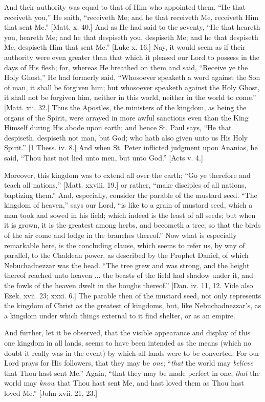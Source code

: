 And their authority was equal to that of Him who appointed them.
``He that receiveth you,'' He saith, ``receiveth Me; and
he that receiveth Me, receiveth Him that sent Me.'' [Matt. x. 40.]
And as He had said to the seventy, ``He that heareth you, heareth
Me; and he that despiseth you, despiseth Me; and he that despiseth Me,
despiseth Him that sent Me.'' [Luke x. 16.] Nay, it would seem as
if their authority were even greater than that which it pleased our
Lord to possess in the days of His flesh; for, whereas He breathed on
them and said, ``Receive ye the Holy Ghost,'' He had formerly
said, ``Whosoever speaketh a word against the Son of man, it shall
be forgiven him; but whosoever speaketh against the Holy Ghost, it
shall not be forgiven him, neither in this world, neither in the world
to come.'' [Matt. xii. 32.] Thus the Apostles, the ministers of
the kingdom, as being the organs of the Spirit, were arrayed in more
awful sanctions even than the King Himself during His abode upon
earth; and hence St. Paul says, ``He that despiseth, despiseth not
man, but God; who hath also given unto us His Holy Spirit.'' [1
Thess. iv. 8.] And when St. Peter inflicted judgment upon Ananias, he
said, ``Thou hast not lied unto men, but unto God.'' [Acts v.
4.]

Moreover, this kingdom was to extend all over the earth; ``Go
ye therefore and teach all nations,'' [Matt. xxviii. 19.] or
rather, ``make disciples of all nations, baptizing them.''
And, especially, consider the parable of the mustard seed. ``The
kingdom of heaven,'' says our Lord, ``is like to a grain of
mustard seed, which a man took and sowed in his field; which indeed is
the least of all seeds; but when it is grown, it is the greatest among
herbs, and becometh a tree; so that the birds of the air come and
lodge in the branches thereof.'' Now what is especially remarkable
here, is the concluding clause, which seems to refer us, by way of
parallel, to the Chaldean power, as described by the Prophet Daniel,
of which Nebuchadnezzar was the head. ``The tree grew and was
strong, and the height thereof reached unto heaven ... the beasts of
the field had shadow under it, and the fowls of the heaven dwelt in
the boughs thereof.'' [Dan. iv. 11, 12. Vide also Ezek. xvii. 23;
xxxi. 6.] The parable then of the mustard seed, not only represents
the kingdom of Christ as the greatest of kingdoms, but, like
Nebuchadnezzar's, as a kingdom under which things external to it find
shelter, or as an empire.

And further, let it be observed, that the visible appearance and
display of this one kingdom in all lands, seems to have been intended
as the means (which no doubt it really was in the event) by which all
lands were to be converted. For our Lord prays for His followers, that
they may be \emph{one}; ``\emph{that} the world may \emph{believe}
that Thou hast sent Me.'' Again, ``that they may be made
perfect in one, \emph{that} the world may \emph{know} that Thou hast
sent Me, and hast loved them as Thou hast loved Me.'' [John xvii.
21, 23.]

